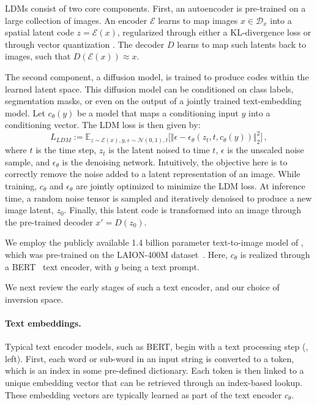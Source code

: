 LDMs consist of two core components. First, an autoencoder is pre-trained on a large collection of images. An encoder $\mathcal{E}$ learns to map images $x\in \mathcal{D}_x$ into a spatial latent code $z = \mathcal{E}(x)$, regularized through either a KL-divergence loss or through vector quantization \citep{van2017neural,agustsson2017soft}. The decoder $D$ learns to map such latents back to images, such that $D\left(\mathcal{E}(x)\right)\approx x$.

The second component, a diffusion model, is trained to produce codes within the learned latent space. This diffusion model can be conditioned on class labels, segmentation masks, or even on the output of a jointly trained text-embedding model. Let $c_\theta(y)$ be a model that maps a conditioning input $y$ into a conditioning vector. The LDM loss is then given by:
\begin{equation}
    L_{LDM} := \mathbb{E}_{z\sim\mathcal{E}(x), y, \epsilon \sim \mathcal{N}(0, 1), t }\Big[ \Vert \epsilon - \epsilon_\theta(z_{t},t, c_\theta(y)) \Vert_{2}^{2}\Big] \, ,
    \label{eq:LDM_loss}
\end{equation}
where $t$ is the time step, $z_t$ is the latent noised to time $t$, $\epsilon$ is the unscaled noise sample, and $\epsilon_\theta$ is the denoising network. 
Intuitively, the objective here is to correctly remove the noise added to a latent representation of an image. While training, $c_\theta$ and $\epsilon_\theta$ are jointly optimized to minimize the LDM loss. At inference time, a random noise tensor is sampled and iteratively denoised to produce a new image latent, $z_0$. Finally, this latent code is transformed into an image through the pre-trained decoder $x' = D(z_0)$.

We employ the publicly available 1.4 billion parameter text-to-image model of \citet{rombach2021highresolution}, which was pre-trained on the LAION-400M dataset~\citep{schuhmann2021laion}. Here, $c_\theta$ is realized through a BERT~\citep{devlin2018bert} text encoder, with $y$ being a text prompt. 

We next review the early stages of such a text encoder, and our choice of inversion space.

\paragraph{Text embeddings.}

Typical text encoder models, such as BERT, begin with a text processing step (, left). First, each word or sub-word in an input string is converted to a token, which is an index in some pre-defined dictionary. 
Each token is then linked to a unique embedding vector that can be retrieved through an index-based lookup. These embedding vectors are typically learned as part of the text encoder $c_\theta$.

